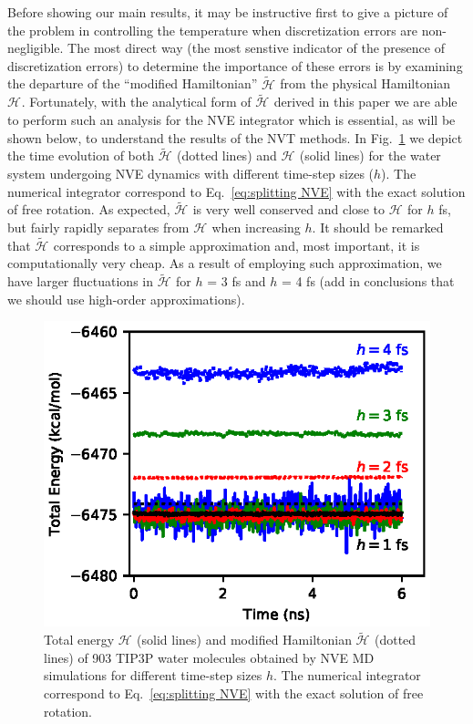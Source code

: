\documentclass[
journal=jctcce,
layout=twocolumn
]{achemso}
\newcommand{\Ham}[1]{{\mathcal H}_\text{#1}}    %
\newcommand{\timestep}{h}
\newcommand{\modified}[1]{\widetilde{#1}}
\begin{document}
Before showing our main results, it may be instructive first to give a picture of the problem in controlling the temperature when discretization errors are non-negligible. 
The most direct way (the most senstive indicator of the presence of discretization errors) to determine the importance of these errors is by examining the departure of the ``modified Hamiltonian'' $\modified{\Ham{}}$ from the physical Hamiltonian $\Ham{}$\cite{Engle_2005}. 
Fortunately, with the analytical form of $\modified{\Ham{}}$ derived in this paper we are able to perform such an analysis for the NVE integrator which is essential, as will be shown below, to understand the results of the NVT methods. 
In Fig.~\ref{fig:nve} we depict the time evolution of both $\modified{\Ham{}}$ (dotted lines) and $\Ham{}$ (solid lines) for the water system undergoing NVE dynamics with different time-step sizes ($\timestep$).
The numerical integrator correspond to Eq.~\ref{eq:splitting NVE} with the exact solution of free rotation. 
As expected, $\modified{\Ham{}}$ is very well conserved and close to $\Ham{}$ for $\timestep$ fs, but fairly rapidly separates from $\Ham{}$ when increasing $\timestep$. 
It should be remarked that $\modified{\Ham{}}$ corresponds to a simple approximation and, most important, it is computationally very cheap. As a result of employing such approximation, we have larger fluctuations in $\modified{\Ham{}}$ for $\timestep$ = 3 fs and $\timestep$ = 4 fs (add in conclusions that we should use high-order approximations).

\begin{figure}
	\includegraphics{Figures/NVE.eps}
	\caption{Total energy $\Ham{}$ (solid lines) and modified Hamiltonian $\modified{\Ham{}}$ (dotted lines) of 903 TIP3P\cite{Jorgensen_1983} water molecules obtained by NVE MD simulations for different time-step sizes $\timestep$. The numerical integrator correspond to Eq.~\ref{eq:splitting NVE} with the exact solution of free rotation.}
	\label{fig:nve}
\end{figure}
\end{document}
